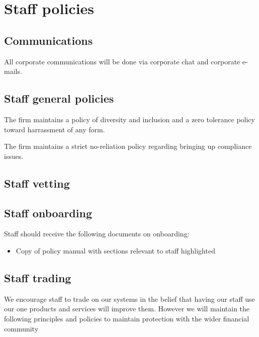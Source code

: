 \section{Staff policies}

\subsection{Communications}
All corporate communications will be done via corporate chat and
corporate e-mails.

\subsection{Staff general policies}

The firm maintains a policy of diversity and inclusion and a zero
tolerance policy toward harrassment of any form.

The firm maintains a strict no-reliation policy regarding bringing up
compliance issues.

\subsection{Staff vetting}

\subsection{Staff onboarding}

Staff should receive the following documents on onboarding:

\begin{itemize}
  \item Copy of policy manual with sections relevant to staff
    highlighted
\end{itemize}

\subsection{Staff trading}

We encourage staff to trade on our systems in the belief that having
our staff use our one products and services will improve them.
However we will maintain the following principles and policies to
maintain protection with the wider financial community

